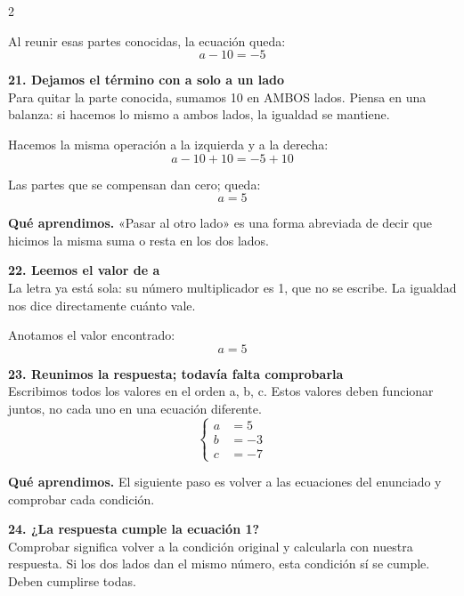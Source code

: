 \documentclass[11pt,a4paper,landscape]{article}
\begin{document}
\begin{multicols*}{2}
\begin{minipage}{\linewidth}
\par\smallskip Al reunir esas partes conocidas, la ecuación queda:
\[a - 10=-5\]
\end{minipage}\par\medskip
\noindent\begin{minipage}{\linewidth}\textbf{21. Dejamos el término con a solo a un lado}\\[2pt]Para quitar la parte conocida, sumamos 10 en AMBOS lados. Piensa en una balanza: si hacemos lo mismo a ambos lados, la igualdad se mantiene.
\par\smallskip Hacemos la misma operación a la izquierda y a la derecha:
\[a - 10 + 10=-5 + 10\]
\par\smallskip Las partes que se compensan dan cero; queda:
\[a=5\]
\par\smallskip\textbf{Qué aprendimos.} «Pasar al otro lado» es una forma abreviada de decir que hicimos la misma suma o resta en los dos lados.
\end{minipage}\par\medskip
\noindent\begin{minipage}{\linewidth}\textbf{22. Leemos el valor de a}\\[2pt]La letra ya está sola: su número multiplicador es 1, que no se escribe. La igualdad nos dice directamente cuánto vale.
\par\smallskip Anotamos el valor encontrado:
\[a=5\]
\end{minipage}\par\medskip
\noindent\begin{minipage}{\linewidth}\textbf{23. Reunimos la respuesta; todavía falta comprobarla}\\[2pt]Escribimos todos los valores en el orden a, b, c. Estos valores deben funcionar juntos, no cada uno en una ecuación diferente.
\[\left\{\begin{aligned}a&=5\\b&=-3\\c&=-7\end{aligned}\right.\]
\par\smallskip\textbf{Qué aprendimos.} El siguiente paso es volver a las ecuaciones del enunciado y comprobar cada condición.
\end{minipage}\par\medskip
\noindent\begin{minipage}{\linewidth}\textbf{24. ¿La respuesta cumple la ecuación 1?}\\[2pt]Comprobar significa volver a la condición original y calcularla con nuestra respuesta. Si los dos lados dan el mismo número, esta condición sí se cumple. Deben cumplirse todas.

\end{minipage}
\end{multicols*}
\end{document}
